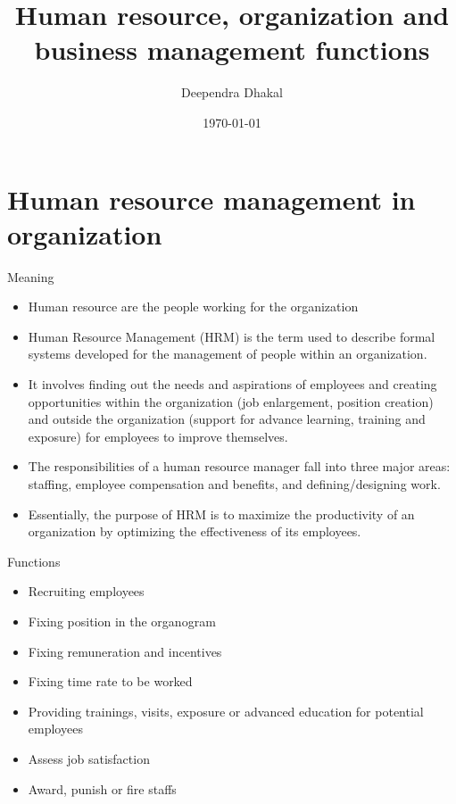 \documentclass[12pt,ignorenonframetext,aspectratio=169]{beamer}
\title{\insertsectionhead}
  {
    \definecolor{white}{rgb}{0.776,0.357,0.157}
    \definecolor{iqss@orange}{rgb}{1,1,1}
    \ifnum \insertmainframenumber > \insertframenumber
    \frame{
      \frametitle{\iqsssectiontitleheader}
      \tableofcontents[currentsection]
    }
    \else
    \frame{
      \frametitle{Backup Slides}
      \tableofcontents[sectionstyle=shaded/shaded,subsectionstyle=shaded/shaded/shaded]
    }
    \fi
  }
\title[]{Human resource, organization and business management
functions}
\author[
        Deependra Dhakal
    ]{Deependra Dhakal}
\institute[
    ]{
    GAASC, Baitadi \and Tribhuwan University
    }
\date[
      \today
  ]{
      \today
        }
\providecommand{\tightlist}{%
  \setlength{\itemsep}{0pt}\setlength{\parskip}{0pt}}
\begin{document}
  \begin{frame}[plain]
  \titlepage
  \end{frame}



\hypertarget{human-resource-management-in-organization}{%
\section{Human resource management in
organization}\label{human-resource-management-in-organization}}

\begin{frame}{Meaning}
\protect\hypertarget{meaning}{}
\begin{itemize}
\tightlist
\item
  Human resource are the people working for the organization
\item
  Human Resource Management (HRM) is the term used to describe formal
  systems developed for the management of people within an organization.
\item
  It involves finding out the needs and aspirations of employees and
  creating opportunities within the organization (job enlargement,
  position creation) and outside the organization (support for advance
  learning, training and exposure) for employees to improve themselves.
\item
  The responsibilities of a human resource manager fall into three major
  areas: staffing, employee compensation and benefits, and
  defining/designing work.
\item
  Essentially, the purpose of HRM is to maximize the productivity of an
  organization by optimizing the effectiveness of its employees.
\end{itemize}
\end{frame}

\begin{frame}{Functions}
\protect\hypertarget{functions}{}
\begin{itemize}
\tightlist
\item
  Recruiting employees
\item
  Fixing position in the organogram
\item
  Fixing remuneration and incentives
\item
  Fixing time rate to be worked
\item
  Providing trainings, visits, exposure or advanced education for
  potential employees
\item
  Assess job satisfaction
\item
  Award, punish or fire staffs
\end{itemize}
\end{frame}
\end{document}
